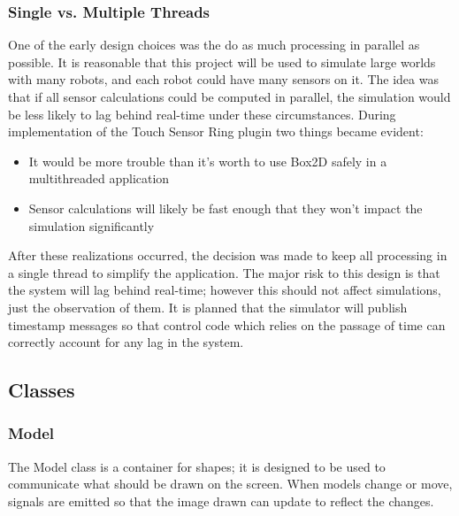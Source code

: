 	\subsubsection*{Single vs. Multiple Threads}
	One of the early design choices was the do as much processing in parallel as possible. It is reasonable that this project will be used to simulate large worlds with many robots, and each robot could have many sensors on it. The idea was that if all sensor calculations could be computed in parallel, the simulation would be less likely to lag behind real-time under these circumstances.
	During implementation of the Touch Sensor Ring plugin two things became evident:
	\begin{itemize}
		\item It would be more trouble than it's worth to use Box2D safely in a multithreaded application
		\item Sensor calculations will likely be fast enough that they won't impact the simulation significantly
	\end{itemize}
	After these realizations occurred, the decision was made to keep all processing in a single thread to simplify the application. The major risk to this design is that the system will lag behind real-time; however this should not affect simulations, just the observation of them. It is planned that the simulator will publish timestamp messages so that control code which relies on the passage of time can correctly account for any lag in the system.

 \newpage
\subsection{Classes}
  \subsubsection*{Model}
  The Model class is a container for shapes; it is designed to be used to communicate what should be drawn on the screen. When models change or move, signals are emitted so that the image drawn can update to reflect the changes.
  
